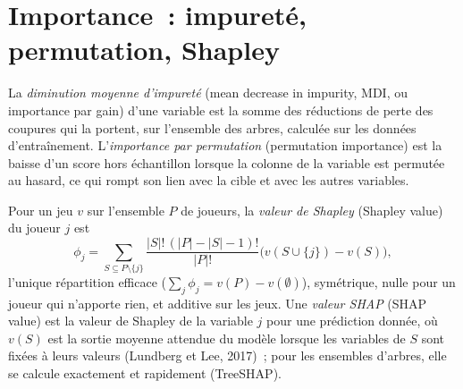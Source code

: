 \section{Importance~: impureté, permutation, Shapley}

\begin{definition}\label{def:ml:feature-engineering-selection-and-importance:mdi}
La \emph{diminution moyenne d'impureté} (mean decrease in impurity, MDI, ou importance par gain) d'une variable est la somme des réductions de perte des coupures qui la portent,
sur l'ensemble des arbres, calculée sur les données d'entraînement. L'\emph{importance
par permutation} (permutation importance) est la baisse d'un score hors échantillon lorsque la colonne de la variable est permutée
au hasard, ce qui rompt son lien avec la cible et avec les autres variables.
\end{definition}

\begin{definition}\label{def:ml:feature-engineering-selection-and-importance:shapley}
Pour un jeu $v$ sur l'ensemble $P$ de joueurs, la \emph{valeur de Shapley} (Shapley value) du joueur $j$ est
\[
\phi_j = \sum_{S\subseteq P\setminus\{j\}}\frac{|S|!\,(|P| - |S| - 1)!}{|P|!}\bigl(v(S\cup\{j\}) - v(S)\bigr),
\]
l'unique répartition efficace ($\sum_j\phi_j = v(P) - v(\emptyset)$), symétrique, nulle pour un joueur qui n'apporte rien,
et additive sur les jeux. Une \emph{valeur SHAP} (SHAP value) est la valeur de Shapley de la variable $j$ pour une prédiction donnée,
où $v(S)$ est la sortie moyenne attendue du modèle lorsque les variables de $S$ sont fixées à leurs valeurs (Lundberg et Lee,
2017)~; pour les ensembles d'arbres, elle se calcule exactement et rapidement (TreeSHAP).
\end{definition}

